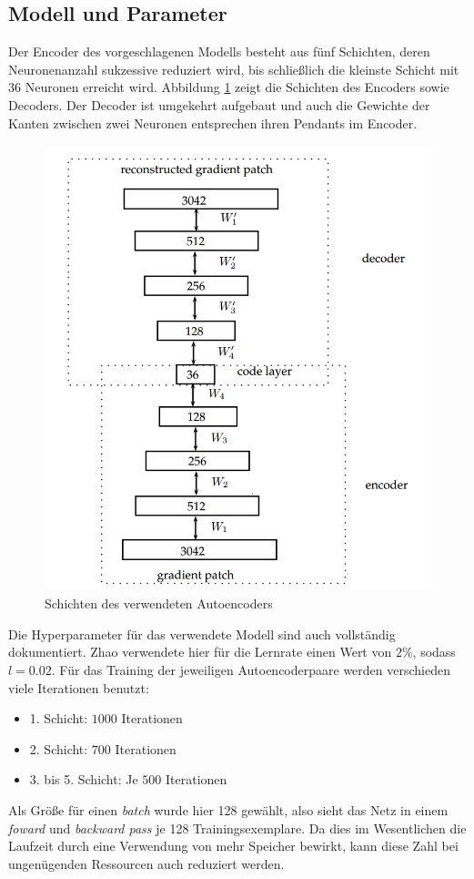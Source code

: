 \subsection{Modell und Parameter}

Der Encoder des vorgeschlagenen Modells besteht aus fünf Schichten, deren Neuronenanzahl sukzessive reduziert wird, bis schließlich die kleinste Schicht mit 36 Neuronen erreicht wird. Abbildung \ref{img:ae_model} zeigt die Schichten des Encoders sowie Decoders. Der Decoder ist umgekehrt aufgebaut und auch die Gewichte der Kanten zwischen zwei Neuronen entsprechen ihren Pendants im Encoder.

\begin{figure}
	\centering
	\includegraphics[scale=0.6]{images/ae_model.png}
	\caption{Schichten des verwendeten Autoencoders \cite{aed2016}}
	\label{img:ae_model}
\end{figure}

Die Hyperparameter für das verwendete Modell sind auch vollständig dokumentiert. Zhao verwendete hier für die Lernrate einen Wert von $2\%$, sodass $l = 0.02$. Für das Training der jeweiligen Autoencoderpaare werden verschieden viele Iterationen benutzt:
\begin{itemize}
	\item 1. Schicht: $1000$ Iterationen
	\item 2. Schicht: $700$ Iterationen
	\item 3. bis 5. Schicht: Je $500$ Iterationen
\end{itemize}
Als Größe für einen \textit{batch} wurde hier 128 gewählt, also sieht das Netz in einem \textit{foward} und \textit{backward pass} je 128 Trainingsexemplare. Da dies im Wesentlichen die Laufzeit durch eine Verwendung von mehr Speicher bewirkt, kann diese Zahl bei ungenügenden Ressourcen auch reduziert werden.

